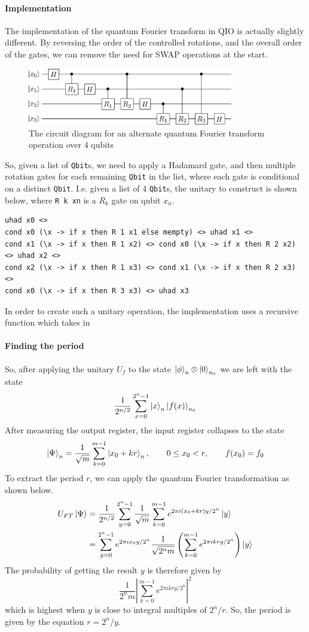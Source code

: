 \documentclass[a4paper,10pt, titlepage, twoside]{article}
\begin{document}
\paragraph{Implementation}
The implementation of the quantum Fourier transform in QIO is actually slightly different. By reversing the order of the controlled rotations, and the overall order of the gates, we can remove the need for SWAP operations at the start.
\begin{figure}[H]
    \centering
    \includegraphics[width=0.8\textwidth]{qft2}
    \caption{The circuit diagram for an alternate quantum Fourier transform operation over 4 qubits}
\end{figure}

So, given a list of \texttt{Qbit}s, we need to apply a Hadamard gate, and then multiple rotation gates for each remaining \texttt{Qbit} in the list, where each gate is conditional on a distinct \texttt{Qbit}. I.e. given a list of 4 \texttt{Qbit}s, the unitary to construct is shown below, where \texttt{R k xn} is a $R_k$ gate on qubit $x_n$.
\begin{verbatim}
uhad x0 <> 
cond x0 (\x -> if x then R 1 x1 else mempty) <> uhad x1 <>
cond x1 (\x -> if x then R 1 x2) <> cond x0 (\x -> if x then R 2 x2) <> uhad x2 <>
cond x2 (\x -> if x then R 1 x3) <> cond x1 (\x -> if x then R 2 x3) <> 
cond x0 (\x -> if x then R 3 x3) <> uhad x3
\end{verbatim}

In order to create such a unitary operation, the implementation uses a recursive function which takes in 

\paragraph{Finding the period}
So, after applying the unitary $U_f$ to the state $\ket \phi _n \otimes \ket 0 _{n_0}$ we are left with the state
$$\frac{1}{2^{n/2}} \sum_{x=0}^{2^n -1} \ket x _n \ket{f(x)}_{n_0}$$
After measuring the output register, the input register collapses to the state
$$\ket \Psi _n = \frac{1}{\sqrt m} \sum _{k=0}^{m-1} \ket{x_0 + kr}_n, \qquad  0 \leq x_0 < r, \qquad f(x_0) = f_0 $$
To extract the period $r$, we can apply the quantum Fourier transformation as shown below.
\begin{align*}
    U_{FT}\ket \Psi &= \frac{1}{2^{n/2}}\sum_{y=0}^{2^n-1}\frac{1}{\sqrt m}\sum_{k=0}^{m-1}e^{2\pi i(x_0 + kr)y/2^n} \ket y \\
    & = \sum_{y=0}^{2^n-1}e^{2\pi i x_0y/2^n} \frac{1}{\sqrt{2^nm}}\left(\sum_{k=0}^{m-1}e^{2\pi i kry/2^n}\right) \ket y
\end{align*}
The probability of getting the result $y$ is therefore given by
$$\frac{1}{2^nm}\left| \sum_{k=0}^{m-1}e^{2\pi i kry/2^n}\right|^2$$
which is highest when $y$ is close to integral multiples of $2^n/r$. So, the period is given by the equation $r = 2^n / y$.
\end{document}
